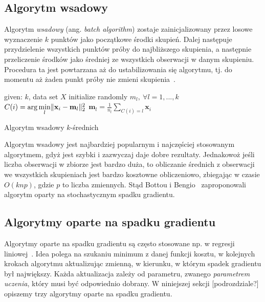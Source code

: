 \documentclass{praca1}
\DeclarePairedDelimiter{\norm}{\lVert}{\rVert}
\begin{document}
\subsection{Algorytm wsadowy}


Algorytm \emph{wsadowy} (ang. \emph{batch algorithm}) zostaje zainicjalizowany przez losowe wyznaczenie $k$ punktów jako początkowe środki skupień. Dalej następuje przydzielenie wszystkich punktów próby do najbliższego skupienia, a następnie przeliczenie środków jako średniej ze wszystkich obserwacji w danym skupieniu. Procedura ta jest powtarzana aż do ustabilizowania się algorytmu, tj. do momentu aż żaden punkt próby nie zmieni skupienia~\cite{Wu2007:topten}.

\begin{algorithm}[!h]
\begin{algorithmic}[1]
		\State given: $k$, data set $X$
        \State initialize randomly $m_l, \ \forall l=1, ..., k$
        \Repeat
                \State $C(i) = \arg \min\limits_{l} \norm{\mathbf{x}_i - \mathbf{m}_l }_2^2 $
            \EndFor
                \State $\mathbf{m}_l = \frac{1}{n_l}\sum\limits_{C(i) = l} \mathbf{x}_i$
            \EndFor

\end{algorithmic}
\caption{Algorytm wsadowy $k$-średnich}\label{alg:001}
\end{algorithm}

Algorytm wsadowy jest najbardziej popularnym i najczęściej stosowanym algorytmem, gdyż jest szybki i zazwyczaj daje dobre rezultaty. Jednakowoż jeśli liczba obserwacji w zbiorze jest bardzo duża, to obliczanie średnich z obserwacji we wszystkich skupieniach jest bardzo kosztowne obliczeniowo, zbiegając w czasie $O(knp)$, gdzie $p$ to liczba zmiennych. Stąd Bottou i Bengio~\cite{Bottou1995:convergenceproperties} zaproponowali algorytm oparty na stochastycznym spadku gradientu.

\subsection{Algorytmy oparte na spadku gradientu}

Algorytmy oparte na spadku gradientu są często stosowane np. w regresji liniowej~\cite{Bottou2012:sgdtricks}. Idea polega na szukaniu minimum z danej funkcji kosztu, w kolejnych krokach algorytmu aktualizując zmienną, w kierunku, w którym spadek gradientu był największy. Każda aktualizacja zależy od parametru, zwanego \emph{parametrem uczenia}, który musi być odpowiednio dobrany. W niniejszej sekcji [podrozdziale?] opiszemy trzy algorytmy oparte na spadku gradientu.
\end{document}
